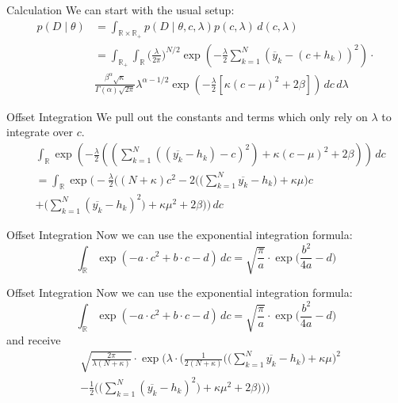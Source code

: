 \documentclass{beamer}
\newcommand{\y}{\overline{y}}
\newcommand{\R}{\mathbb{R}}
\begin{document}
  	\begin{frame}{Calculation}
  		We can start with the usual setup:
  		\begin{align}
    		p(D \mid \theta) &= \int_{\R \times \R_+} p(D \mid \theta,c,\lambda) 				p(c, \lambda) \, d(c, \lambda) \\
    		&= \int_{\R_+} \int_\R \biggl(\frac{\lambda}{2\pi}\biggr)^{N/2} \exp				\left( - \frac{\lambda}{2} \sum_{k = 1}^N (\y_k - (c + h_k))^2 \right) 			\cdot \\
    		& \frac{\beta^\alpha \sqrt{\kappa}}{\Gamma(\alpha)\sqrt{2\pi}} 						\lambda^{\alpha-1/2} \exp\left(- \frac{\lambda}{2} [\kappa (c - \mu)^2 			+ 2\beta] \right) \, dc \, d\lambda
		\end{align}
  	\end{frame}
  	
  	\begin{frame}{Offset Integration}
  		We pull out the constants and terms which only rely on $\lambda$ to 				integrate over $c$.
  		\begin{align}
   			& \int_\R \exp \left( -\frac{\lambda}{2} \left( \left( \sum_{k = 1}^N 				((\overline{y_k} - h_k)  - c)^2 \right) + \kappa(c - \mu)^2 +2\beta 				\right) \right) \, dc \\
    		&= \int_\R \exp \Biggl( -\frac{\lambda}{2} \Biggl( (N + \kappa) c^2 - 				2 \Biggl(\Biggl(\sum_{k = 1}^N \overline{y_k}-h_k \Biggr) + \kappa \mu 			\Biggr) c \\
    		&+ \Biggl( \sum_{k = 1}^N (\overline{y_k} - h_k)^2 \Biggr) + \kappa 				\mu^2 + 2\beta \Biggr) \Biggr) \, dc
		\end{align}
  	\end{frame}
  	
  	\begin{frame}{Offset Integration}
  		Now we can use the exponential integration formula:
  		\[
  			\int_\R \exp(-a \cdot c^2 + b \cdot c - d) \, dc = \sqrt{\frac{\pi}					{a}} \cdot \exp \biggl( \frac{b^2}{4a} - d \biggr)
  		\]
  	\end{frame}  	
  	
  	\begin{frame}{Offset Integration}
  		Now we can use the exponential integration formula:
  		\[
  			\int_\R \exp(-a \cdot c^2 + b \cdot c - d) \, dc = \sqrt{\frac{\pi}					{a}} \cdot \exp \biggl( \frac{b^2}{4a} - d \biggr)
  		\]
  		and receive
  		\begin{align}
  			& \sqrt{\frac{2 \pi}{\lambda(N + \kappa)}} \cdot \exp \Biggl( \lambda 				\cdot \Biggl( \frac{1}{2(N + \kappa)} \Biggl(\Biggl(\sum_{k = 1}^N 					\overline{y_k} - h_k\Biggr)+ \kappa \mu \Biggr)^2 \\
    		&- \frac{1}{2}\Biggl( \Biggl( \sum_{k = 1}^N (\overline{y_k} - h_k)^2 				\Biggr) + \kappa \mu^2 + 2\beta \Biggr) \Biggr) \Biggr)
  		\end{align}
  	\end{frame}
  	
\end{document}
